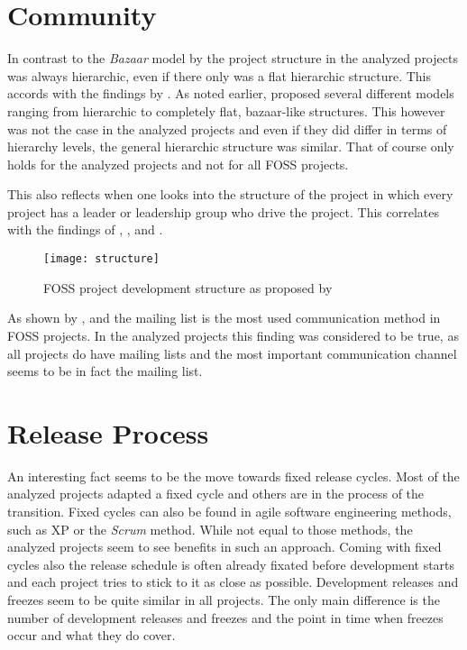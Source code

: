 \section{Community} %

In contrast to the \emph{Bazaar} model by \textcite{Raymond1998} the project
structure in the analyzed projects was always hierarchic, even if there only
was a flat hierarchic structure. This accords with the findings by
\textcite{Crowston2005}. As noted earlier, \textcite{Ghosh2005} proposed
several different models ranging from hierarchic to completely flat,
bazaar-like structures. This however was not the case in the analyzed projects
and even if they did differ in terms of hierarchy levels, the general
hierarchic structure was similar. That of course only holds for the analyzed
projects and not for all \ac{FOSS} projects.

This also reflects when one looks into the structure of the project in which
every project has a leader or leadership group who drive the project. This
correlates with the findings of \textcite{Johnson2001},
\textcite{Crowston2005a}, \textcite{Warsta2003} and
\textcite{Krishnamurthy2002}.

\begin{figure}[htbp]
  \centering
  \texttt{[image: structure]}
  \caption{\ac{FOSS} project development structure as proposed by \textcite{Crowston2005}}
\end{figure}

As shown by \textcite{Schweik2003}, \textcite{Ogawa2007} and
\textcite{Kim2003} the mailing list is the most used communication
method in \ac{FOSS} projects. In the analyzed projects this finding was
considered to be true, as all projects do have mailing lists and the most
important communication channel seems to be in fact the mailing list.


\section{Release Process} %

An interesting fact seems to be the move towards fixed release cycles. Most of
the analyzed projects adapted a fixed cycle and others are in the process of
the transition. Fixed cycles can also be found in agile software engineering
methods, such as \ac{XP} or the \emph{Scrum} method. While not equal to those
methods, the analyzed projects seem to see benefits in such an approach. Coming
with fixed cycles also the release schedule is often already fixated before
development starts and each project tries to stick to it as close as possible.
Development releases and freezes seem to be quite similar in all projects. The
only main difference is the number of development releases and freezes and the
point in time when freezes occur and what they do cover.

